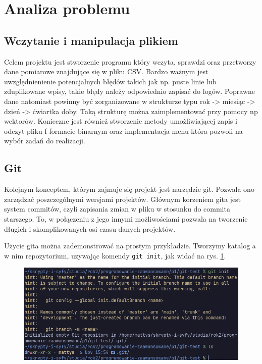\newpage
\section{Analiza problemu}		%

\subsection{Wczytanie i manipulacja plikiem}

Celem projektu jest stworzenie programu który wczyta, sprawdzi oraz przetworzy dane pomiarowe znajdujące się w pliku CSV. Bardzo ważnym jest uwzględnienienie potencjalnych błędów takich jak np. puste linie lub zduplikowane wpisy, takie błędy należy odpowiednio zapisać do logów.
Poprawne dane natomiast powinny być zorganizowane w strukturze typu rok -> miesiąc -> dzień -> ćwiartka doby. Taką strukturę można zaimplementować przy pomocy np wektorów.
Konieczne jest również stworzenie metody umożliwiającej zapis i odczyt pliku f formacie binarnym oraz implementacja menu która pozwoli na wybór zadań do realizacji.

\subsection{Git}
Kolejnym konceptem, którym zajmuje się projekt jest narzędzie git\cite{gitsite}. Pozwala ono zarządzać poszczególnymi wersjami projektów. Głównym korzeniem gita jest system commitów, czyli zapisania zmian w pliku w stosunku do commita starszego. To, w połączeniu z jego innymi możliwościami pozwala na tworzenie długich i skomplikowanych osi czasu danych projektów.

Użycie gita można zademonstrować na prostym przykładzie. Tworzymy katalog a w nim repozytorium, uzywając komendy \texttt{git init}, jak widać na rys. \ref{fig:git_init}.

\begin{figure}[H]
	\centering
	\includegraphics[width=1\textwidth]{images/git_init.png}
	\caption{}
	\label{fig:git_init}
\end{figure}

